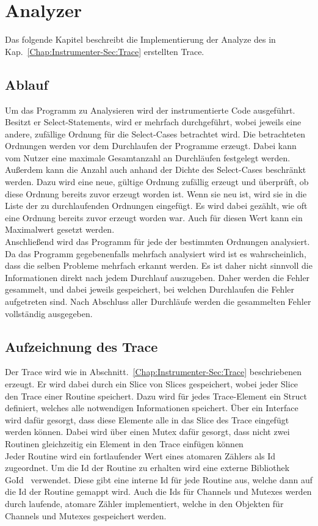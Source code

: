 
\chapter{Analyzer} \label{Chap:Implement}

Das folgende Kapitel beschreibt die Implementierung der Analyze des in 
Kap.~\ref{Chap:Instrumenter-Sec:Trace} erstellten 
Trace.

\section{Ablauf}
Um das Programm zu Analysieren wird der instrumentierte Code ausgeführt.
Besitzt er Select-Statements, wird er mehrfach durchgeführt, 
wobei jeweils eine andere, zufällige Ordnung für die Select-Cases 
betrachtet wird. Die betrachteten Ordnungen werden vor dem Durchlaufen 
der Programme erzeugt. Dabei kann vom Nutzer eine maximale 
Gesamtanzahl an Durchläufen festgelegt werden. Außerdem kann die 
Anzahl auch anhand der Dichte des Select-Cases beschränkt werden. Dazu wird 
eine neue, gültige Ordnung zufällig erzeugt und überprüft, ob diese 
Ordnung bereits zuvor erzeugt worden ist. Wenn sie neu ist, wird sie in 
die Liste der zu durchlaufenden Ordnungen eingefügt. Es wird dabei gezählt,
wie oft eine Ordnung bereits zuvor erzeugt worden war. Auch für diesen 
Wert kann ein Maximalwert gesetzt werden.\\
Anschließend wird das Programm für jede der bestimmten Ordnungen analysiert.
Da das Programm gegebenenfalls mehrfach analysiert wird ist es wahrscheinlich, dass 
die selben Probleme mehrfach erkannt werden. Es ist daher nicht sinnvoll 
die Informationen direkt nach jedem Durchlauf auszugeben. Daher werden die 
Fehler gesammelt, und dabei jeweils gespeichert, bei welchen Durchlaufen die 
Fehler aufgetreten sind. Nach Abschluss aller Durchläufe werden die 
gesammelten Fehler vollständig ausgegeben.

\section{Aufzeichnung des Trace}
Der Trace wird wie in Abschnitt.~\ref{Chap:Instrumenter-Sec:Trace}
beschriebenen erzeugt. Er wird dabei durch ein Slice von Slices 
gespeichert, wobei jeder Slice den Trace einer Routine 
speichert. Dazu wird für jedes Trace-Element ein Struct definiert, 
welches alle notwendigen Informationen speichert. Über ein Interface 
wird dafür gesorgt, dass diese Elemente alle in das Slice des Trace eingefügt
werden können. Dabei wird über einen Mutex dafür gesorgt, dass nicht 
zwei Routinen gleichzeitig ein Element in den Trace einfügen können\\
Jeder Routine wird ein fortlaufender Wert eines atomaren Zählers als Id zugeordnet. 
Um die Id der Routine zu erhalten wird eine externe Bibliothek GoId~\cite{goid} verwendet.
Diese gibt eine interne Id für jede Routine aus, welche dann auf die Id der Routine 
gemappt wird.
Auch die Ids für Channels und Mutexes werden durch laufende, atomare Zähler 
implementiert, welche in den Objekten für Channels und Mutexes gespeichert werden.

